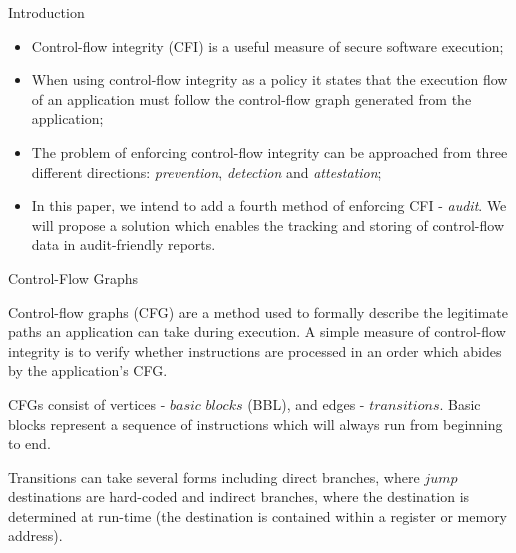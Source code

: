 \documentclass[final]{beamer}
\newlength{\onecolwid}
\begin{document}
\begin{frame}[t]
\begin{columns}[t]
\begin{column}{\onecolwid}
\begin{block}{Introduction}
\begin{itemize}
	\item Control-flow integrity (CFI) is a useful measure of secure software execution; \vspace*{0.4cm}
	\item When using control-flow integrity as a policy it states that the execution flow of an application must follow the control-flow graph generated from the application; \vspace*{0.4cm}
	\item The problem of enforcing control-flow integrity can be approached from three different directions: \textit{prevention}, \textit{detection} and \textit{attestation}; \vspace*{0.4cm}
	\item In this paper, we intend to add a fourth method of enforcing CFI - \textit{audit}. We will propose a solution which enables the tracking and storing of control-flow data in audit-friendly reports.
\end{itemize}

\end{block}


\begin{block}{Control-Flow Graphs}

Control-flow graphs (CFG) are a method used to formally describe the legitimate paths an application can take during execution. A simple measure of control-flow integrity is to verify whether instructions are processed in an order which abides by the application's CFG.

CFGs consist of vertices - $basic$ $blocks$ (BBL), and edges - $transitions$. Basic blocks represent a sequence of instructions which will always run from beginning to end.

Transitions can take several forms including direct branches, where $jump$ destinations are hard-coded and indirect branches, where the destination is determined at run-time (the destination is contained within a  register or memory address).

\end{block}

\end{column} %



\end{columns}
\end{frame}
\end{document}
